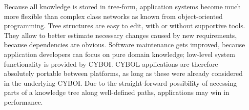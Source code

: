 Because all knowledge is stored in tree-form, application systems become much
more flexible than complex class networks as known from object-oriented
programming. Tree structures are easy to edit, with or without supportive tools.
They allow to better estimate necessary changes caused by new requirements,
because dependencies are obvious. Software maintenance gets improved, because
application developers can focus on pure domain knowledge; low-level system
functionality is provided by CYBOI. CYBOL applications are therefore absolutely
portable between platforms, as long as these were already considered in the
underlying CYBOI. Due to the straight-forward possibility of accessing parts of
a knowledge tree along well-defined paths, applications may win in performance.
